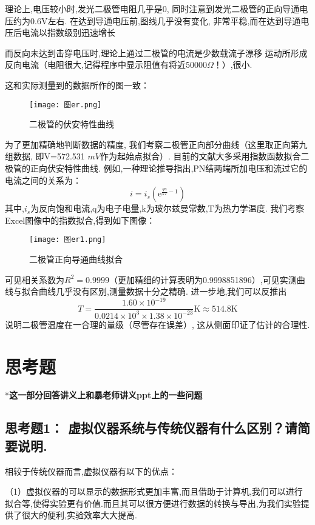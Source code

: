 \documentclass[11pt]{article}
\begin{document}
\begin{enumerate}
  
   理论上,电压较小时,发光二极管电阻几乎是0,
   同时注意到发光二极管的正向导通电压约为0.6V左右.
   在达到导通电压前,图线几乎没有变化,
   非常平稳,而在达到导通电压后电流以指数级别迅速增长 

而反向未达到击穿电压时,理论上通过二极管的电流是少数载流子漂移
运动所形成反向电流（电阻很大,记得程序中显示阻值有将近50000$\Omega$！）,很小.

这和实际测量到的数据所作的图一致：

\begin{figure}[H]
    \centering
    \texttt{[image: 图er.png]}
    \caption{二极管的伏安特性曲线}
\end{figure}

为了更加精确地判断数据的精度,
我们考察二极管正向部分曲线（这里取正向第九组数据,
即V=572.531 $mV$作为起始点拟合）.
目前的文献大多采用指数函数拟合二极管的正向伏安特性曲线.
例如,一种理论推导指出,PN结两端所加电压和流过它的电流之间的关系为：
\[
  i=i_s({\mathrm e}^{\frac{qu}{kT}-1})
\]
其中,$i_s$为反向饱和电流,q为电子电量,k为玻尔兹曼常数,T为热力学温度.
我们考察Excel图像中的指数拟合,得到如下图像：

\begin{figure}[htbp]
    \centering
    \texttt{[image: 图er1.png]}
    \caption{二极管正向导通曲线拟合}
\end{figure}

可见相关系数为$R^2=0.9999$（更加精细的计算表明为0.9998851896）,可见实测曲线与拟合曲线几乎没有区别,测量数据十分之精确.
进一步地,我们可以反推出
\[
   T=\frac{1.60\times 10^{-19}}{0.0214\times10^3\times 1.38\times10^{-23}}{\mathrm K}\approx 514.8\mathrm{K}
\]
说明二极管温度在一合理的量级（尽管存在误差）,
这从侧面印证了估计的合理性.

\end{enumerate}
    

\section{思考题}

*\bf{这一部分回答讲义上和暴老师讲义ppt上的一些问题}

\subsection*{思考题1：  \textbf{虚拟仪器系统与传统仪器有什么区别？请简要说明.}}

相较于传统仪器而言,虚拟仪器有以下的优点：

（1）虚拟仪器的可以显示的数据形式更加丰富,而且借助于计算机,我们可以进行拟合等,使得实验更有价值.而且其可以很方便进行数据的转换与导出,为我们实验提供了很大的便利,实验效率大大提高.
\end{document}
